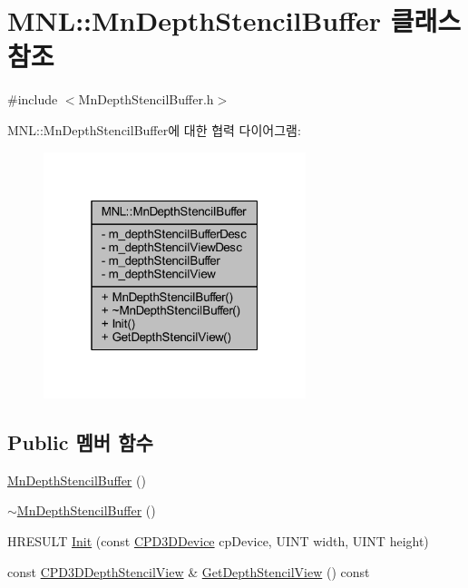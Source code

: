 \hypertarget{class_m_n_l_1_1_mn_depth_stencil_buffer}{}\section{M\+NL\+:\+:Mn\+Depth\+Stencil\+Buffer 클래스 참조}
\label{class_m_n_l_1_1_mn_depth_stencil_buffer}


{\ttfamily \#include $<$Mn\+Depth\+Stencil\+Buffer.\+h$>$}



M\+NL\+:\+:Mn\+Depth\+Stencil\+Buffer에 대한 협력 다이어그램\+:\nopagebreak
\begin{figure}[H]
\begin{center}
\leavevmode
\includegraphics[width=217pt]{class_m_n_l_1_1_mn_depth_stencil_buffer__coll__graph}
\end{center}
\end{figure}
\subsection*{Public 멤버 함수}
\begin{DoxyCompactItemize}
\item 
\hyperlink{class_m_n_l_1_1_mn_depth_stencil_buffer_a62c99b992fdd488bbcedee12e377e09f}{Mn\+Depth\+Stencil\+Buffer} ()
\item 
\hyperlink{class_m_n_l_1_1_mn_depth_stencil_buffer_a887ad94ae7dbf34b1599f63874e42433}{$\sim$\+Mn\+Depth\+Stencil\+Buffer} ()
\item 
H\+R\+E\+S\+U\+LT \hyperlink{class_m_n_l_1_1_mn_depth_stencil_buffer_a5cbabb78041c31d65ff6204aa733fa44}{Init} (const \hyperlink{namespace_m_n_l_a1eec210db8f309a4a9ac0d9658784c31}{C\+P\+D3\+D\+Device} cp\+Device, U\+I\+NT width, U\+I\+NT height)
\item 
const \hyperlink{namespace_m_n_l_a12b3c209d76ede855300e637f4192a04}{C\+P\+D3\+D\+Depth\+Stencil\+View} \& \hyperlink{class_m_n_l_1_1_mn_depth_stencil_buffer_aa05ba43eb3a290433969f2ca7972bc00}{Get\+Depth\+Stencil\+View} () const
\end{DoxyCompactItemize}
